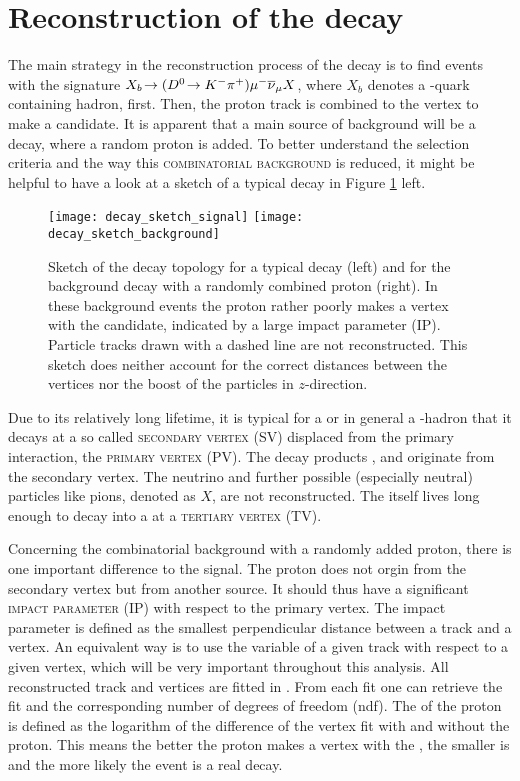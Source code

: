 \section{Reconstruction of the decay \LbToDpmunuX}
The main strategy in the reconstruction process of the decay \LbToDpmunuX is to find events with the signature $X_{b}\!\rightarrow ({{D}^0}\!\rightarrow {\ensuremath{{K}^-}}{\ensuremath{{\pi}^+}}) {\mu^-} {{\overline{\nu}}_\mu} X$, where $X_b$ denotes a \bquark-quark containing hadron, first.
Then, the proton track is combined to the \Dz\mun vertex to make a \LbToDpmunuX candidate.
It is apparent that a main source of background will be a  decay, where a random proton is added.
To better understand the selection criteria and the way this \textsc{combinatorial background} is reduced, it might be helpful to have a look at a sketch of a typical \LbToDpmunuX decay in Figure \ref{fig:DecaySketch} left.
\begin{figure}[hptb]
	\centering
	\texttt{[image: decay\_sketch\_signal]}
	\texttt{[image: decay\_sketch\_background]}
	\caption{
        Sketch of the decay topology for a typical \LbToDpmunuX decay (left) and for the background decay  with a randomly combined proton (right).
        In these background events the proton rather poorly makes a vertex with the \Dz\mun candidate, indicated by a large impact parameter (IP).
        Particle tracks drawn with a dashed line are not reconstructed.
        This sketch does neither account for the correct distances between the vertices nor the boost of the particles in $z$-direction.
    }
	\label{fig:DecaySketch}
\end{figure}
Due to its relatively long lifetime, it is typical for a \Lb or in general a \bquark-hadron that it decays at a so called \textsc{secondary vertex (SV)} displaced from the primary \proton\proton interaction, the \textsc{primary vertex (PV)}.
The decay products \Dz, \mun and \proton  originate from the secondary vertex. 
The neutrino and further possible (especially neutral) particles like pions, denoted as $X$, are not reconstructed.
The \Dz itself lives long enough to decay into a \Km\pip at a \textsc{tertiary vertex (TV)}.

Concerning the combinatorial background  with a randomly added proton, there is one important difference to the signal.
The proton does not orgin from the secondary vertex but from another source.
It should thus have a significant \textsc{impact parameter (IP)} with respect to the primary vertex.
The impact parameter is defined as the smallest perpendicular distance between a track and a vertex.
An equivalent way is to use the \logIP variable of a given track with respect to a given vertex, which will be very important throughout this analysis.
All reconstructed track and vertices are fitted in \lhcb.
From each fit one can retrieve the fit \chisq and the corresponding number of degrees of freedom (ndf).
The \logIP of the proton is defined as the logarithm of the difference of the \Dz\mun vertex fit \chisq with and without the proton.
This means the better the proton makes a vertex with the \Dz\mun, the smaller is \logIP and the more likely the event is a real \LbToDpmunuX decay.

